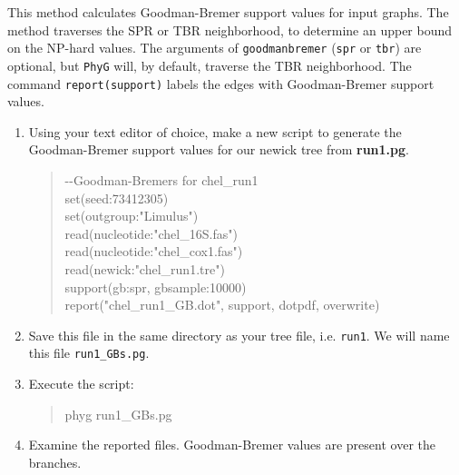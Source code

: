 \documentclass[]{article}
\newcommand{\phyg}{\texttt{PhyG} }
\begin{document}
This method calculates Goodman-Bremer support values for input graphs. The 
method traverses the SPR or TBR neighborhood, to determine an upper bound 
on the NP-hard values. The arguments of \texttt{goodmanbremer} (\texttt{spr} or 
\texttt{tbr}) are optional, but \phyg will, by default, traverse the TBR neighborhood. 
The command \texttt{report(support)} labels the edges with Goodman-Bremer support 
values.

\begin{enumerate}
 
 \item Using your text editor of choice, make a new script to generate the 
 Goodman-Bremer support values for our newick tree from \textbf{run1.pg}.
 
         \begin{quote}
	-\/-Goodman-Bremers for chel\_run1\\
	set(seed:73412305) \\
	set(outgroup:"Limulus") \\
	read(nucleotide:"chel\_16S.fas") \\
	read(nucleotide:"chel\_cox1.fas") \\
	read(newick:"chel\_run1.tre") \\
	support(gb:spr, gbsample:10000)\\
	report("chel\_run1\_GB.dot", support, dotpdf, overwrite)
        \end{quote}
       
\item Save this file in the same directory as your tree file, i.e. \texttt{run1}.
We will name this file \texttt{run1\_GBs.pg}.

\item Execute the script:

	\begin{quote}
  	phyg run1\_GBs.pg
	\end{quote}
	
\item Examine the reported files. Goodman-Bremer values are present
over the branches.
         
\end{enumerate}




\end{document}
